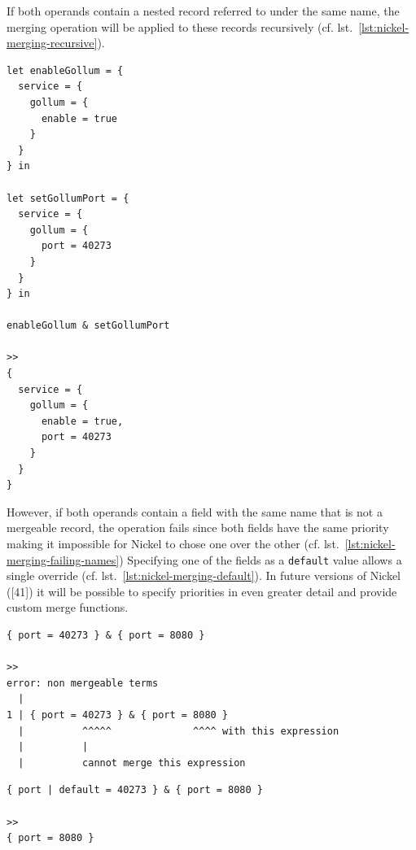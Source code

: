 \documentclass[
  a4paper,
  bibtex,
  english,
  nomenclature]{kthlatex/kththesis/kththesis}
\begin{document}
If both operands contain a nested record referred to under the same
name, the merging operation will be applied to these records recursively
(cf. lst.~\ref{lst:nickel-merging-recursive}).

\begin{codelisting}

\caption{Merging of two records without shared nested records}

\hypertarget{lst:nickel-merging-recursive}{%
\label{lst:nickel-merging-recursive}}%
\begin{verbatim}
let enableGollum = {
  service = {
    gollum = {
      enable = true
    }
  } 
} in

let setGollumPort = {
  service = {
    gollum = {
      port = 40273
    }
  } 
} in 

enableGollum & setGollumPort

>> 
{
  service = {
    gollum = {
      enable = true,
      port = 40273
    }
  } 
} 
\end{verbatim}

\end{codelisting}

However, if both operands contain a field with the same name that is not
a mergeable record, the operation fails since both fields have the same
priority making it impossible for Nickel to chose one over the other
(cf. lst.~\ref{lst:nickel-merging-failing-names}) Specifying one of the
fields as a \texttt{default} value allows a single override (cf.
lst.~\ref{lst:nickel-merging-default}). In future versions of Nickel
({[}41{]}) it will be possible to specify priorities in even greater
detail and provide custom merge functions.

\begin{codelisting}

\caption{Failing merge of two records with common field}

\hypertarget{lst:nickel-merging-failing-names}{%
\label{lst:nickel-merging-failing-names}}%
\begin{verbatim}
{ port = 40273 } & { port = 8080 }

>>
error: non mergeable terms
  |
1 | { port = 40273 } & { port = 8080 }
  |          ^^^^^              ^^^^ with this expression
  |          |                   
  |          cannot merge this expression
\end{verbatim}

\end{codelisting}

\begin{codelisting}

\caption{Succeeding merge of two records with default value for common field}

\hypertarget{lst:nickel-merging-default}{%
\label{lst:nickel-merging-default}}%
\begin{verbatim}
{ port | default = 40273 } & { port = 8080 }

>>
{ port = 8080 }
\end{verbatim}

\end{codelisting}
\end{document}
